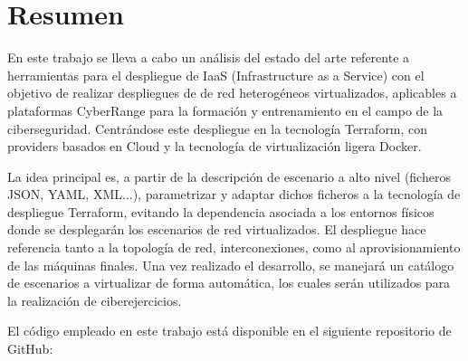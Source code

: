 \newpage
\thispagestyle{plain}
\section*{Resumen}

En este trabajo se lleva a cabo un análisis del estado del arte referente a herramientas para el despliegue de IaaS (Infrastructure as a Service) con el objetivo de realizar despliegues de de red heterogéneos virtualizados, aplicables a plataformas CyberRange para la formación y entrenamiento en el campo de la ciberseguridad. Centrándose este despliegue en la tecnología Terraform, con providers basados en Cloud y la tecnología de virtualización ligera Docker.

La idea principal es, a partir de la descripción de escenario a alto nivel (ficheros JSON, YAML, XML...), parametrizar y adaptar dichos ficheros a la tecnología de despliegue Terraform, evitando la dependencia asociada a los entornos físicos donde se desplegarán los escenarios de red virtualizados. El despliegue hace referencia tanto a la topología de red, interconexiones, como al aprovisionamiento de las máquinas finales. Una vez realizado el desarrollo, se manejará un catálogo de escenarios a virtualizar de forma automática, los cuales serán utilizados para la realización de ciberejercicios.

El código empleado en este trabajo está disponible en el siguiente repositorio de GitHub:

\vspace{0.2cm}

\begin{tcolorbox}[colback=orange!5!white,colframe=orange!75!black]
  \centering\href{https://github.com/samugs13/DAERV}{\textbf{\color{blue}{https://github.com/samugs13/DAERV}}}
\end{tcolorbox}

\afterpage{\blankpage}
